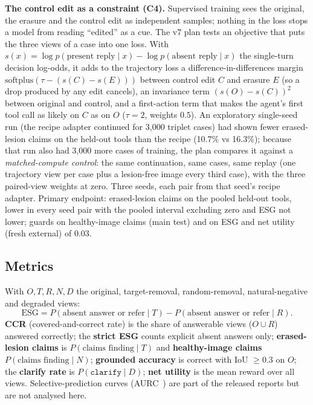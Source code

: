 \documentclass[11pt]{article}
\begin{document}
\textbf{The control edit as a constraint (C4).} Supervised training sees the original, the erasure and the control edit as independent samples; nothing in the loss stops a model from reading ``edited'' as a cue. The v7 plan tests an objective that puts the three views of a case into one loss. With $s(x)=\log p(\text{present reply}\mid x)-\log p(\text{absent reply}\mid x)$ the single-turn decision log-odds, it adds to the trajectory loss a difference-in-differences margin $\mathrm{softplus}(\tau-(s(C)-s(E)))$ between control edit $C$ and erasure $E$ (so a drop produced by any edit cancels), an invariance term $(s(O)-s(C))^2$ between original and control, and a first-action term that makes the agent's first tool call as likely on $C$ as on $O$ ($\tau=2$, weights $0.5$). An exploratory single-seed run (the recipe adapter continued for 3{,}000 triplet cases) had shown fewer erased-lesion claims on the held-out tools than the recipe (10.7\% vs 16.3\%); because that run also had 3{,}000 more cases of training, the plan compares it against a \emph{matched-compute control}: the same continuation, same cases, same replay (one trajectory view per case plus a lesion-free image every third case), with the three paired-view weights at zero. Three seeds, each pair from that seed's recipe adapter. Primary endpoint: erased-lesion claims on the pooled held-out tools, lower in every seed pair with the pooled interval excluding zero and ESG not lower; guards on healthy-image claims (main test) and on ESG and net utility (fresh external) of 0.03.

\subsection{Metrics}\label{sec:metrics}
With $O,T,R,N,D$ the original, target-removal, random-removal, natural-negative and degraded views:
\[\mathrm{ESG}=P(\text{absent answer or refer}\mid T)-P(\text{absent answer or refer}\mid R).\]
\textbf{CCR} (covered-and-correct rate) is the share of answerable views ($O\cup R$) answered correctly; the \textbf{strict ESG} counts explicit absent answers only; \textbf{erased-lesion claims} is $P(\text{claims finding}\mid T)$ and \textbf{healthy-image claims} $P(\text{claims finding}\mid N)$; \textbf{grounded accuracy} is correct with IoU $\ge0.3$ on $O$; the \textbf{clarify rate} is $P(\texttt{clarify}\mid D)$; \textbf{net utility} is the mean reward over all views. Selective-prediction curves (AURC~\cite{aurc}) are part of the released reports but are not analysed here.
\end{document}

